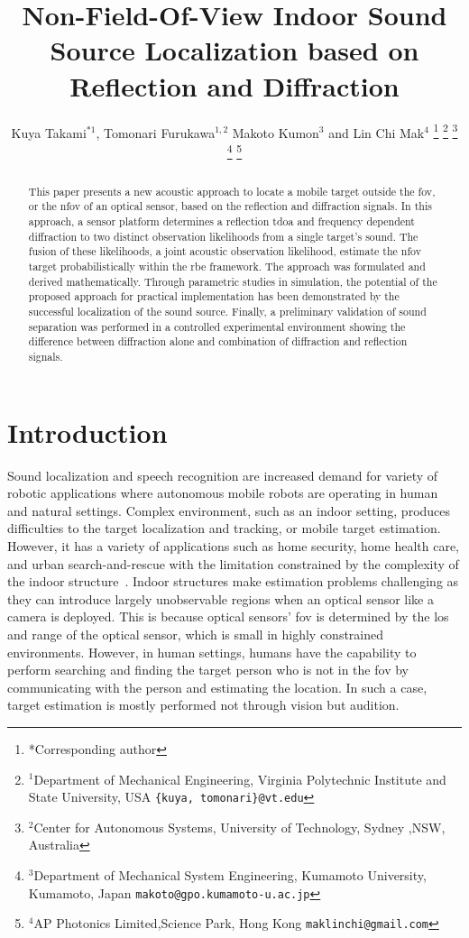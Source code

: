 \documentclass[letterpaper, 10 pt, conference]{ieeeconf}  %
\title{\LARGE \bf
Non-Field-Of-View Indoor Sound Source Localization based on Reflection and Diffraction}
\author{Kuya Takami$^{*1}$, Tomonari Furukawa$^{1,2}$ Makoto Kumon$^{3}$ and Lin Chi Mak$^{4}$%
\thanks{*Corresponding author}%
\thanks{$^{1}$Department of Mechanical Engineering, Virginia Polytechnic Institute and State University, USA
        {\tt\small \{kuya, tomonari\}@vt.edu}}
\thanks{$^{2}$Center for Autonomous Systems, University of Technology, Sydney ,NSW, Australia
        {\tt\small}}      
\thanks{$^{3}$Department of Mechanical System Engineering, Kumamoto University, Kumamoto, Japan
        {\tt\small makoto@gpo.kumamoto-u.ac.jp}}
\thanks{$^{4}$AP Photonics Limited,Science Park, Hong Kong
        {\tt\small maklinchi@gmail.com}}
        }
\begin{document}
\maketitle
\thispagestyle{empty}
\pagestyle{empty}
\begin{abstract}
This paper presents a new acoustic approach to locate a mobile target outside the \gls{fov}, or the \gls{nfov} of an optical sensor, based on the reflection and diffraction signals. In this approach, a sensor platform determines a reflection \gls{tdoa} and frequency dependent diffraction to two distinct observation likelihoods from a single target's sound. The fusion of these likelihoods, a joint acoustic observation likelihood, estimate the \gls{nfov} target probabilistically within the \gls{rbe} framework. The approach was formulated and derived mathematically. Through parametric studies in simulation, the potential of the proposed approach for practical implementation has been demonstrated by the successful localization of the sound source. Finally, a preliminary validation of sound separation was performed in a controlled experimental environment showing the difference between diffraction alone and combination of diffraction and reflection signals.
\end{abstract}
\section{Introduction}
Sound localization and speech recognition are increased demand for variety of robotic applications where autonomous mobile robots are operating in human and natural settings. Complex environment, such as an indoor setting, produces difficulties to the target localization and tracking, or mobile target estimation. However, it has a variety of applications such as home security, home health care, and urban search-and-rescue with the limitation constrained by the complexity of the indoor structure~\cite{priyantha2005mobile,Khoury2009,argentieri2014survey}. Indoor structures make estimation problems challenging as they can introduce largely unobservable regions when an optical sensor like a camera is deployed.  This is because optical sensors' \acrfull{fov} is determined by the \gls{los} and range of the optical sensor, which is small in highly constrained environments. However, in human settings, humans have the capability to perform searching and finding the target person who is not in the \gls{fov} by communicating with the person and estimating the location. In such a case, target estimation is mostly performed not through vision but audition. 
\end{document}
